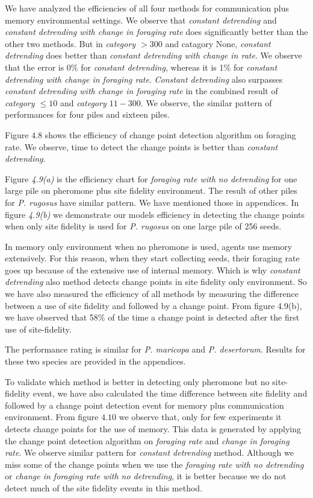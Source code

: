 We have analyzed the efficiencies of all four methods for communication plus memory environmental settings. We observe that \textit{constant detrending} and \textit{constant detrending with change in foraging rate} does significantly better than the other two methods. But in \textit{category $>300$} and catagory None, \textit{constant detrending} does better than \textit{constant detrending with change in rate}. We observe that the error is 0\% for \textit{constant detrending}, whereas it is 1\% for \textit{constant detrending with change in foraging rate}. \textit{Constant detrending} also surpasses \textit{constant detrending with change in foraging rate} in the combined result of \textit{category $\le 10$} and \textit{category $11-300$}. We observe, the similar pattern of performances for four piles and sixteen piles. \par
Figure $4.8$ shows the efficiency of change point detection algorithm on foraging rate. We observe, time to detect the change points is better than \textit{constant detrending}. \par%
Figure \textit{4.9(a)} is the efficiency chart for \textit{foraging rate with no detrending} for one large pile on pheromone plus site fidelity environment. The result of other piles for \textit{P. rugosus} have similar pattern. We have mentioned those in appendices. In figure \textit{4.9(b)} we demonstrate our model\textquotesingle s efficiency in detecting the change points when only site fidelity is used for \textit{P. rugosus} on one large pile of 256 seeds.\par 
In memory only environment when no pheromone is used, agents use memory extensively. For this reason, when they start collecting seeds, their foraging rate goes up because of the extensive use of internal memory. Which is why \textit{constant detrending} also method detects change points in site fidelity only environment. So we have also measured the efficiency of all methods by measuring the difference between a use of site fidelity and followed by a change point. From figure 4.9(b), we have observed that 58\% of the time a change point is detected after the first use of site-fidelity.\par  
The performance rating is similar for \textit{P. maricopa} and \textit{P. desertorum}. Results for these two species are provided in the appendices. \par
To validate which method is better in detecting only pheromone but no site-fidelity event, we have also calculated the time difference between site fidelity and followed by a change point detection event for memory plus communication environment. From figure $4.10$ we observe that, only for few experiments it detects change points for the use of memory. This data is generated by applying the change point detection algorithm on \textit{foraging rate} and \textit{change in foraging rate}. We observe similar pattern for \textit{constant detrending} method. Although we miss some of the change points when we use the \textit{foraging rate with no detrending} or \textit{change in foraging rate with no detrending}, it is better because we do not detect much of the site fidelity events in this method.\par 
